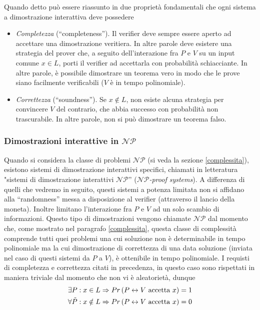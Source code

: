 \documentclass{article}
\theoremstyle{definition}
\begin{document}
Quando detto può essere riassunto in due proprietà fondamentali che ogni sistema a dimostrazione interattiva deve possedere
\begin{itemize}
    \item \emph{Completezza} (``completeness''). Il verifier deve sempre essere aperto ad accettare una dimostrazione veritiera. In altre parole deve esistere una strategia del prover che, a seguito dell'interazione fra $P$ e $V$ su un input comune $x \in L$, porti il verifier ad accettarla con probabilità schiacciante.
    In altre parole, è possibile dimostrare un teorema vero in modo che le prove siano facilmente verificabili ($V$ è in tempo polinomiale).
    \item \emph{Correttezza} (``soundness''). Se $x \notin L$, non esiste alcuna strategia per convincere $V$ del contrario, che abbia successo con probabilità non trascurabile. In altre parole, non si può dimostrare un teorema falso.
\end{itemize}
\subsubsection{Dimostrazioni interattive in \texorpdfstring{\texttt{$\mathcal{NP}$}}{NP}}
 Quando si considera la classe di problemi $\mathcal{NP}$ (si veda la sezione \ref{complessita}), esistono sistemi di dimostrazione interattivi specifici, chiamati in letteratura "sistemi di dimostrazione interattivi $\mathcal{NP}$'' (\emph{\texttt{$\mathcal{NP}$}-proof systems}). A differenza di quelli che vedremo in seguito, questi sistemi a potenza limitata non si affidano alla ``randomness'' messa a disposizione al verifier (attraverso il lancio della moneta). Inoltre limitano l'interazione fra $P$ e $V$ ad un solo scambio di informazioni. 
Questo tipo di dimostrazioni vengono chiamate \texttt{$\mathcal{NP}$} dal momento che, come mostrato nel paragrafo \ref{complessita}, questa classe di complessità comprende tutti quei problemi una cui soluzione non è determinabile in tempo polinomiale ma la cui dimostrazione di correttezza di una data soluzione (inviata nel caso di questi sistemi da $P$ a $V$), è ottenibile in tempo polinomiale.
I requisti di completezza e correttezza citati in precedenza, in questo caso sono rispettati in maniera triviale dal momento che non vi è aleatorietà, dunque
\begin{align*}
    &\exists P : x \in L \Rightarrow Pr\left(P \leftrightarrow V\text{ accetta } x\right) = 1 \\
    &\forall \Tilde{P} : x \notin L \Rightarrow Pr\left(P \leftrightarrow V \text{ accetta } x\right) = 0
\end{align*}
\end{document}
